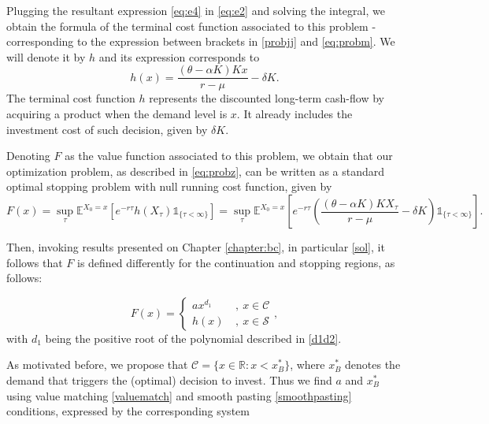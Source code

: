 Plugging the resultant expression \eqref{eq:e4} in \eqref{eq:e2} and solving the integral, we obtain the formula of the terminal cost function associated to this problem - corresponding to the expression between brackets in \eqref{probjj} and \eqref{eq:probm}. We will denote it by $h$ and its expression corresponds to
\begin{equation}
h(x)=\frac{(\theta-\alpha K)K x}{r-\mu}- \delta K.
\label{prob1:h}
\end{equation}
The terminal cost function $h$ represents the discounted long-term cash-flow by acquiring a product when the demand level is $x$. It already includes the investment cost of such decision, given by $\delta K$.
 
Denoting $F$ as the value function associated to this problem, we obtain that our optimization problem, as described in \eqref{eq:probz}, can be written as a standard optimal stopping problem with null running cost function, given by
\begin{equation}
F(x)=\sup_\tau \mathds{E}^{X_0=x}\left[e^{-r\tau } h(X_\tau) \mathds{1}_{\{\tau<\infty\}} \right]=\sup_\tau \mathds{E}^{X_0=x}\left[e^{-r\tau } \left( \frac{(\theta-\alpha K)K X_\tau}{r-\mu}-\delta K \right) \mathds{1}_{\{\tau<\infty\}} \right].
\label{eq:prob3}
\end{equation}


Then, invoking results presented on Chapter \ref{chapter:bc}, in particular \eqref{sol}, it follows that $F$ is defined differently for the continuation and stopping regions, as follows:

\begin{equation}
F(x)=\begin{cases} a x^{d_1}  \ &, \ x \in \mathcal{C} \\
h(x) \ &, \ x \in \mathcal{S}
\end{cases},
\label{1_F}
\end{equation}
with $d_1$ being the positive root of the polynomial described in \eqref{d1d2}.

As motivated before, we propose that $\mathcal{C}=\{x\in \mathds{R}:x< x_B^* \}$, where $x_B^*$ denotes the demand that triggers the (optimal) decision to invest. Thus we find $a$ and $x_B^*$ using value matching \eqref{valuematch} and smooth pasting \eqref{smoothpasting} conditions, expressed by the corresponding system

